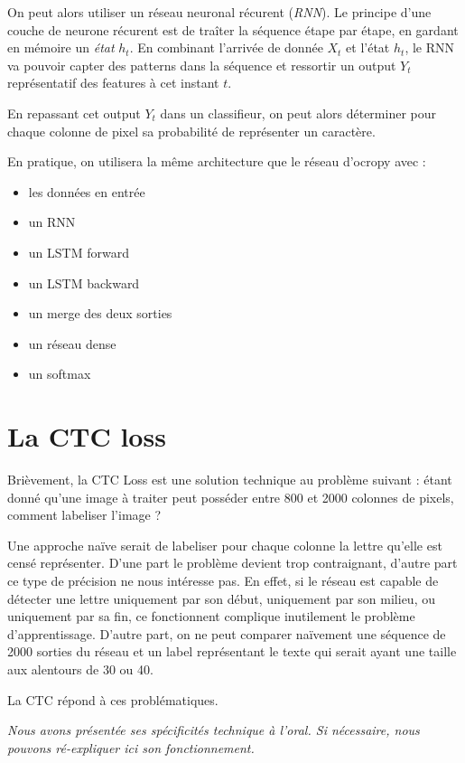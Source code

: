 \documentclass{report}
\begin{document}
On peut alors utiliser un réseau neuronal récurent (\emph{RNN}).
Le principe d'une couche de neurone récurent est de traîter la séquence étape par étape, en gardant en mémoire un \emph{état} $h_t$.
En combinant l'arrivée de donnée $X_t$ et l'état $h_t$, le RNN va pouvoir capter des patterns dans la séquence et ressortir un output $Y_t$ représentatif des features à cet instant $t$.

En repassant cet output $Y_t$ dans un classifieur, on peut alors déterminer pour chaque colonne de pixel sa probabilité de représenter un caractère.

En pratique, on utilisera la même architecture que le réseau d'ocropy avec :

\begin{itemize}
	\item les données en entrée
	\item un RNN
		\item un LSTM forward
		\item un LSTM backward
	\item un merge des deux sorties
	\item un réseau dense
	\item un softmax
\end{itemize}

\section{La CTC loss}

Brièvement, la CTC Loss est une solution technique au problème suivant :
étant donné qu'une image à traiter peut posséder entre 800 et 2000 colonnes de pixels, comment labeliser l'image ?

Une approche naïve serait de labeliser pour chaque colonne la lettre qu'elle est censé représenter.
D'une part le problème devient trop contraignant, d'autre part ce type de précision ne nous intéresse pas.
En effet, si le réseau est capable de détecter une lettre uniquement par son début, uniquement par son milieu, ou uniquement par sa fin, ce fonctionnent complique inutilement le problème d'apprentissage.
D'autre part, on ne peut comparer naïvement une séquence de 2000 sorties du réseau et un label représentant le texte qui serait ayant une taille aux alentours de 30 ou 40.

La CTC répond à ces problématiques.

\textit{
Nous avons présentée ses spécificités technique à l'oral.
Si nécessaire, nous pouvons ré-expliquer ici son fonctionnement.
}
\end{document}
